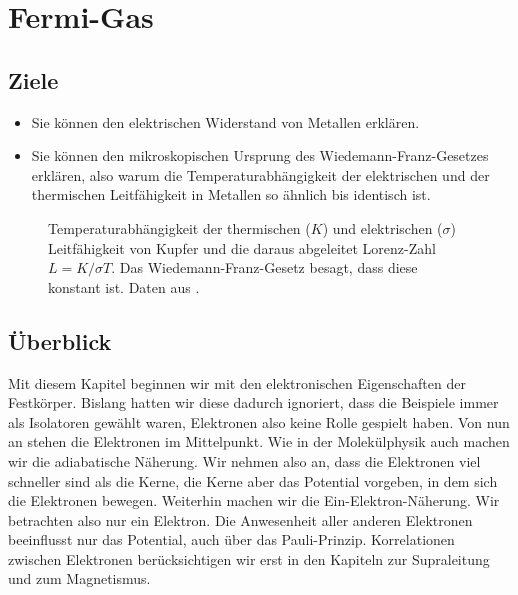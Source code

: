 \renewcommand{\chapterauthors}{Markus Lippitz}
\renewcommand{\lastmod}{8. Mai 2023}

\chapter{Fermi-Gas}




\section{Ziele}
 


\begin{itemize}  
\item Sie können den elektrischen Widerstand von Metallen erklären.
\item Sie können den mikroskopischen  Ursprung des Wiedemann-Franz-Gesetzes erklären, also warum die Temperaturabhängigkeit der elektrischen und  der thermischen Leitfähigkeit in Metallen so ähnlich bis identisch ist.

\end{itemize}

\begin{figure}
    \caption{Temperaturabhängigkeit der thermischen ($K$) und elektrischen ($\sigma$) Leitfähigkeit von Kupfer und die daraus abgeleitet Lorenz-Zahl $L = K/ \sigma T$. Das Wiedemann-Franz-Gesetz besagt, dass diese konstant ist. 
        Daten aus \cite{Hust1984}. \label{fig:2_Cu_Lorenz}}
\end{figure} 

\section{Überblick}

Mit diesem Kapitel beginnen wir mit den elektronischen Eigenschaften der Festkörper. Bislang hatten wir diese dadurch ignoriert, dass die Beispiele immer als Isolatoren gewählt waren, Elektronen also keine Rolle gespielt haben. Von nun an stehen die Elektronen im Mittelpunkt. Wie in der Molekülphysik auch machen wir die adiabatische Näherung. Wir nehmen also an, dass die Elektronen viel schneller sind als die Kerne, die Kerne aber das Potential vorgeben, in dem sich die Elektronen bewegen. Weiterhin machen wir die Ein-Elektron-Näherung. Wir betrachten also nur ein Elektron. Die Anwesenheit aller anderen Elektronen beeinflusst nur das Potential, auch über das Pauli-Prinzip. Korrelationen zwischen Elektronen berücksichtigen wir  erst in den Kapiteln zur Supraleitung und zum Magnetismus.

